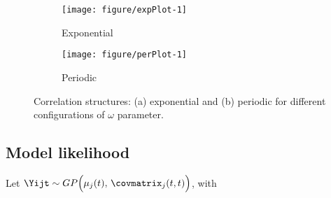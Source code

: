 \begin{figure}[t]
  \centering
  \begin{subfigure}{.45\textwidth}
\begin{knitrout}
\color{fgcolor}
\texttt{[image: figure/expPlot-1]} 

\end{knitrout}
    \caption{Exponential}
  \end{subfigure}
  \begin{subfigure}{.45\textwidth}
\begin{knitrout}
\color{fgcolor}
\texttt{[image: figure/perPlot-1]} 

\end{knitrout}
    \caption{Periodic}
  \end{subfigure}
  \caption{Correlation structures: (a) exponential and (b) periodic for different configurations of $\omega$ parameter.}
  \label{fig:corstructure}
\end{figure}





\subsection{Model likelihood}

Let $\Yijt \sim GP \Bigl( \mu_j(t), \, \covmatrix_j(t,t) \Bigr)$, with

